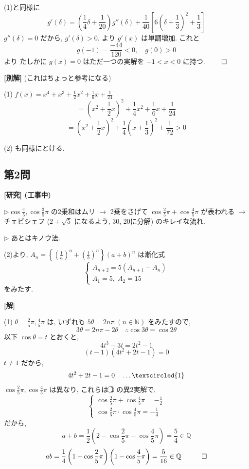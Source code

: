 \documentclass[../main.tex]{subfiles}
\begin{document}
(1)と同様に
\[
  g'(\delta) = \left( \frac{1}{4}\delta + \frac{1}{20} \right) g''(\delta) + \frac{1}{40}\left[ 6\left(\delta + \frac{1}{3}\right)^2 + \frac{1}{3} \right]
\]
$g''(\delta) = 0$ だから, $g'(\delta) > 0$.
より $g'(x)$ は単調増加. これと
\[
  g(-1) = \frac{-44}{120} < 0, \quad g(0) > 0
\]
より たしかに $g(x) = 0$ はただ一つの実解を $-1 < x < 0$ に持つ. \hfill $\qed$

\bigskip

\noindent
\textbf{[別解]} (これはちょっと参考になる)

\noindent
(1) $f(x) = x^4 + x^3 + \frac{1}{2}x^2 + \frac{1}{6}x + \frac{1}{24}$
\[
  = \left(x^2 + \frac{1}{2}x\right)^2 + \frac{1}{4}x^2 + \frac{1}{6}x + \frac{1}{24}
\]
\[
  = \left(x^2 + \frac{1}{2}x\right)^2 + \frac{1}{4}\left(x + \frac{1}{3}\right)^2 + \frac{1}{72} > 0
\]

\noindent
(2) も同様にとける.

\newpage

\subsection*{第2問}

\noindent
\textbf{[研究] (工事中)}

\noindent
$\triangleright \cos\frac{\pi}{5}, \cos\frac{3}{5}\pi$ の2乗和はムリ
$\to$ 2乗をさげて $\cos\frac{2}{5}\pi + \cos\frac{4}{5}\pi$ が表われる
$\to$ チェビシェフ ($2+\sqrt{5}$ になるよう, 30, 20に分解) のキレイな流れ.

\noindent
$\triangleright$ あとはキノウ法.

\noindent
(2)より, $A_n = \left\{ \left(\frac{1}{a}\right)^n + \left(\frac{1}{b}\right)^n \right\} (a+b)^n$ は漸化式
\[
  \begin{cases}
    A_{n+2} = 5(A_{n+1} - A_n) \\
    A_1 = 5, \; A_2 = 15
  \end{cases}
\]
をみたす.

\bigskip

\noindent
\textbf{[解]}

\noindent
(1) $\theta = \frac{2}{5}\pi, \frac{4}{5}\pi$ は, いずれも $5\theta = 2n\pi \; (n \in \mathbb{N})$ をみたすので,
\[
  3\theta = 2n\pi - 2\theta \quad \therefore \cos 3\theta = \cos 2\theta
\]
以下 $\cos\theta = t$ とおくと,
\[
  4t^3 - 3t = 2t^2 - 1
\]
\[
  (t-1)(4t^2 + 2t - 1) = 0
\]
$t \ne 1$ だから,
\[
  4t^2 + 2t - 1 = 0 \quad \dots \textcircled{1}
\]
$\cos\frac{2}{5}\pi, \cos\frac{4}{5}\pi$ は異なり, これらは \textcircled{1} の異2実解で,
\[
  \begin{cases}
    \cos\frac{2}{5}\pi + \cos\frac{4}{5}\pi = -\frac{1}{2} \\[2mm]
    \cos\frac{2}{5}\pi \cdot \cos\frac{4}{5}\pi = -\frac{1}{4}
  \end{cases}
\]
だから,
\[
  a+b = \frac{1}{2} \left( 2 - \cos\frac{2}{5}\pi - \cos\frac{4}{5}\pi \right) = \frac{5}{4} \in \mathbb{Q}
\]
\[
  ab = \frac{1}{4} \left( 1 - \cos\frac{2}{5}\pi \right) \left( 1 - \cos\frac{4}{5}\pi \right) = \frac{5}{16} \in \mathbb{Q} \quad \hfill \qed
\]
\end{document}
